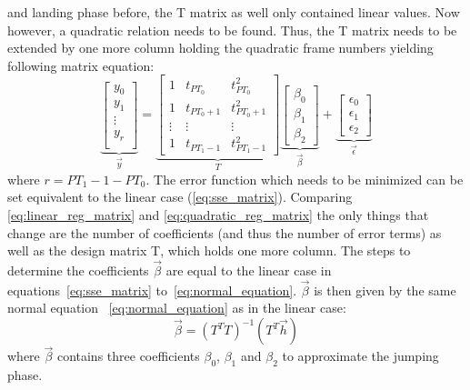 and  landing phase before, the T matrix as well only contained linear values.
Now however, a quadratic relation needs to be found.
Thus, the T matrix needs to be extended by one more column holding the
quadratic frame numbers yielding following matrix equation:
\begin{equation}\label{eq:quadratic_reg_matrix}
    \underbrace{
    \begin{bmatrix}
        y_0\\
        y_1\\
        \vdots\\
        y_r\\
    \end{bmatrix}}_{\vec{y}}
    =
    \underbrace{
    \begin{bmatrix}
        1 & t_{PT_0} & t_{PT_0}^2\\
        1 & t_{PT_0 + 1} & t_{PT_0 + 1}^2\\
        \vdots & \vdots & \vdots\\
        1 & t_{PT_1 - 1} & t_{PT_1 - 1}^2
    \end{bmatrix}}_{T}
    \underbrace{
    \begin{bmatrix}
        \beta_0\\
        \beta_1\\
        \beta_2
    \end{bmatrix}}_{\vec{\beta}}
    +
    \underbrace{
    \begin{bmatrix}
        \epsilon_0\\
        \epsilon_1\\
        \epsilon_2
    \end{bmatrix}}_{\vec{\epsilon}}
\end{equation}
where $r = PT_1 - 1 - PT_0$.
The error function which needs to be minimized can be set equivalent to the
linear case (\autoref{eq:sse_matrix}).
Comparing \autoref{eq:linear_reg_matrix} and \autoref{eq:quadratic_reg_matrix}
the only things that change are the number of coefficients (and thus the
number of error terms) as well as the design matrix T, which holds one more
column.
The steps to determine the coefficients $\vec{\beta}$ are equal to the linear
case in equations~\ref{eq:sse_matrix} to~\ref{eq:normal_equation}.
$\vec{\beta}$ is then given by the same normal equation~
\ref{eq:normal_equation} as in the linear case:
\[
    \vec{\beta} = (T^T T)^{-1}(T^T\vec{h}) 
\] 
where $\vec{\beta}$ contains three coefficients $\beta_0$, $\beta_1$ and
$\beta_2$ to approximate the jumping phase.\\\\

